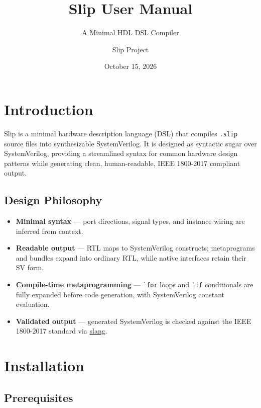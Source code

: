 \documentclass[lang=en,11pt]{elegantbook}
\title{Slip User Manual}
\subtitle{A Minimal HDL DSL Compiler}
\author{Slip Project}
\date{October 15, 2026}
\newcommand{\code}[1]{\texttt{#1}}
\newcommand{\slipinline}[1]{\lstinline[language=Slip]|#1|}
\begin{document}
\maketitle
\frontmatter
\tableofcontents
\mainmatter


\chapter{Introduction}

Slip is a minimal hardware description language (DSL) that compiles \code{.slip} source files into synthesizable SystemVerilog. It is designed as syntactic sugar over SystemVerilog, providing a streamlined syntax for common hardware design patterns while generating clean, human-readable, IEEE 1800-2017 compliant output.

\section{Design Philosophy}

\begin{itemize}
  \item \textbf{Minimal syntax} --- port directions, signal types, and instance wiring are inferred from context.
  \item \textbf{Readable output} --- RTL maps to SystemVerilog constructs; metaprograms and bundles expand into ordinary RTL, while native interfaces retain their SV form.
  \item \textbf{Compile-time metaprogramming} --- \slipinline{`for} loops and \slipinline{`if} conditionals are fully expanded before code generation, with SystemVerilog constant evaluation.
  \item \textbf{Validated output} --- generated SystemVerilog is checked against the IEEE 1800-2017 standard via \href{https://github.com/MikePopoloski/slang}{slang}.
\end{itemize}

\chapter{Installation}

\section{Prerequisites}
\end{document}
